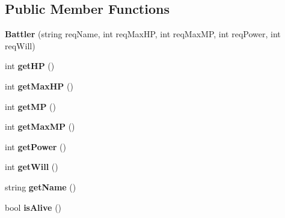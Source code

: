 \subsection*{Public Member Functions}
\begin{DoxyCompactItemize}
\item 
\hypertarget{class_simple_r_p_g_1_1_battler_a2d569c96856b4016469898c763cd80cd}{{\bfseries Battler} (string req\+Name, int req\+Max\+H\+P, int req\+Max\+M\+P, int req\+Power, int req\+Will)}\label{class_simple_r_p_g_1_1_battler_a2d569c96856b4016469898c763cd80cd}

\item 
\hypertarget{class_simple_r_p_g_1_1_battler_a33717e4b3db920bc7b1e91cd5923d440}{int {\bfseries get\+H\+P} ()}\label{class_simple_r_p_g_1_1_battler_a33717e4b3db920bc7b1e91cd5923d440}

\item 
\hypertarget{class_simple_r_p_g_1_1_battler_a4cfa0cad3cbcd37a0b778371f1bca4ac}{int {\bfseries get\+Max\+H\+P} ()}\label{class_simple_r_p_g_1_1_battler_a4cfa0cad3cbcd37a0b778371f1bca4ac}

\item 
\hypertarget{class_simple_r_p_g_1_1_battler_a545f4fc14281ea68bcbc096d74283027}{int {\bfseries get\+M\+P} ()}\label{class_simple_r_p_g_1_1_battler_a545f4fc14281ea68bcbc096d74283027}

\item 
\hypertarget{class_simple_r_p_g_1_1_battler_ac5abba3a65530d57317ffb745904ece5}{int {\bfseries get\+Max\+M\+P} ()}\label{class_simple_r_p_g_1_1_battler_ac5abba3a65530d57317ffb745904ece5}

\item 
\hypertarget{class_simple_r_p_g_1_1_battler_a26be8c08a8909d19e617ef6bc9d0751a}{int {\bfseries get\+Power} ()}\label{class_simple_r_p_g_1_1_battler_a26be8c08a8909d19e617ef6bc9d0751a}

\item 
\hypertarget{class_simple_r_p_g_1_1_battler_ab7539435d53520b9aaee35958e14472f}{int {\bfseries get\+Will} ()}\label{class_simple_r_p_g_1_1_battler_ab7539435d53520b9aaee35958e14472f}

\item 
\hypertarget{class_simple_r_p_g_1_1_battler_ad74e17513ba2f88b2bc6830ce9259e3b}{string {\bfseries get\+Name} ()}\label{class_simple_r_p_g_1_1_battler_ad74e17513ba2f88b2bc6830ce9259e3b}

\item 
\hypertarget{class_simple_r_p_g_1_1_battler_a78193521e8fb0e7d60688c0a7bc303be}{bool {\bfseries is\+Alive} ()}\label{class_simple_r_p_g_1_1_battler_a78193521e8fb0e7d60688c0a7bc303be}


\end{DoxyCompactItemize}
